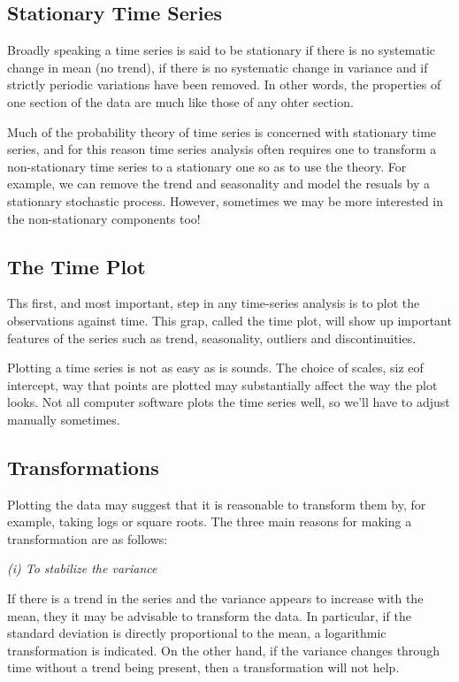 \subsection{Stationary Time Series}
Broadly speaking a time series is said to be stationary if there is no systematic change in mean (no trend), if there is no systematic change in variance and if strictly periodic variations have been removed. In other words, the properties of one section of the data are much like those of any ohter section.

Much of the probability theory of time series is concerned with stationary time series, and for this reason time series analysis often requires one to transform a non-stationary time series to a stationary one so as to use the theory. For example, we can remove the trend and seasonality and model the resuals by a stationary stochastic process. However, sometimes we may be more interested in the non-stationary components too!



\subsection{The Time Plot}
Ths first, and most important, step in any time-series analysis is to plot the observations against time. This grap, called the time plot, will show up important features of the series such as trend, seasonality, outliers and discontinuities. 

Plotting a time series is not as easy as is sounds. The choice of scales, siz eof intercept, way that points are plotted may substantially affect the way the plot looks. Not all computer software plots the time series well, so we'll have to adjust manually sometimes.



\subsection{Transformations}
Plotting the data may suggest that it is reasonable to transform them by, for example, taking logs or square roots. The three main reasons for making a transformation are as follows:

\textit{(i) To stabilize the variance}

If there is a trend in the series and the variance appears to increase with the mean, they it may be advisable to transform the data. In particular, if the standard deviation is directly proportional to the mean, a logarithmic transformation is indicated. On the other hand, if the variance changes through time without a trend being present, then a transformation will not help.

